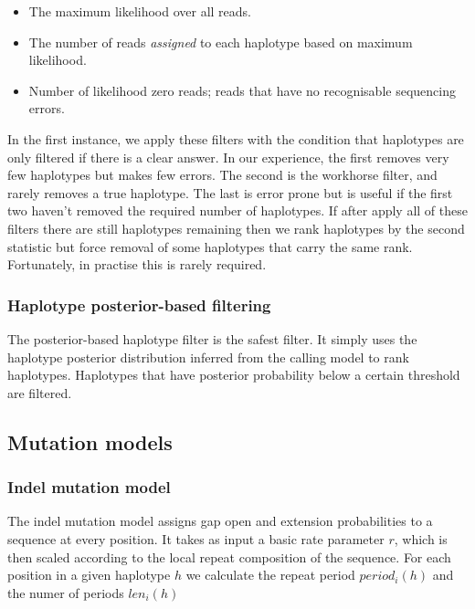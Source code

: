 \documentclass{article}
\begin{document}
\begin{itemize}
	\item The maximum likelihood over all reads.
	\item The number of reads \emph{assigned} to each haplotype based on maximum likelihood.
	\item Number of likelihood zero reads; reads that have no recognisable sequencing errors.
\end{itemize}

In the first instance, we apply these filters with the condition that haplotypes are only filtered if there is a clear answer. In our experience, the first removes very few haplotypes but makes few errors. The second is the workhorse filter, and rarely removes a true haplotype. The last is error prone but is useful if the first two haven't removed the required number of haplotypes. If after apply all of these filters there are still haplotypes remaining then we rank haplotypes by the second statistic but force removal of some haplotypes that carry the same rank. Fortunately, in practise this is rarely required.

\subsubsection{Haplotype posterior-based filtering}\label{haplotype-posterior-filtering}

The posterior-based haplotype filter is the safest filter. It simply uses the haplotype posterior distribution inferred from the calling model to rank haplotypes. Haplotypes that have posterior probability below a certain threshold are filtered.

\subsection{Mutation models}

\subsubsection{Indel mutation model} \label{model:indel}

The indel mutation model assigns gap open and extension probabilities to a sequence at every position. It takes as input a basic rate parameter $r$, which is then scaled according to the local repeat composition of the sequence. For each position in a given haplotype $h$ we calculate the repeat period $period_i(h)$ and the numer of periods $len_i(h)$
\end{document}
